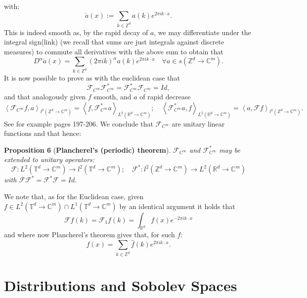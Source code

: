 \documentclass[
]{article}
\begin{document}
with: \[\check{a}(x):=\sum_{k\in{\mathbb Z}^d}a(k)e^{2\pi ik\cdot x}.\]
This is indeed smooth as, by the rapid decay of \(a\), we may
differentiate under the integral sign(link) (we recall that sums are
just integrals against discrete measures) to commute all derivatives
with the above sum to obtain that \[\label{dgivesrpft}
    D^\alpha \check{a}(x)=\sum_{k\in{\mathbb Z}^d}(2\pi ik)^\alpha a(k)e^{2\pi ik\cdot x}\quad\forall{a}\in {s({\mathbb Z}^d\to\mathbb{C}^m)}.\]
It is now possible to prove as with the euclidean case that
\[\mathcal{F}_{C^\infty}\mathcal{F}^*_{C^\infty}=\mathcal{F}^*_{C^\infty}\mathcal{F}_{C^\infty}=Id,\]
and that analogously given \(f\) smooth, and \(a\) of rapid decrease
\[\left\langle\mathcal{F}_{C^\infty} f,a\right\rangle_{l^2({\mathbb Z}^d\to\mathbb{C}^m)}=\left\langle f,\mathcal{F}_{C^\infty}^*a\right\rangle_{L^2({\mathbb R}^d\to\mathbb{C}^m)};\quad\left\langle\mathcal{F}_{C^\infty}^* a,f\right\rangle_{L^2({\mathbb R}^d\to\mathbb{C}^m)}=\left\langle a,\mathcal{F}f\right\rangle_{l^2({\mathbb Z}^d\to\mathbb{C}^m)}.\]
See for example \cite{Tay} pages 197-206. We conclude that
\(\mathcal{F}_{C^\infty}\) are unitary linear functions and that hence:

\leavevmode{}%
\textbf{Proposition 6} (\textbf{Plancherel's (periodic) theorem}).
\emph{\(\mathcal{F}_{C^\infty}\) and \(\mathcal{F}_{C^\infty}^*\) may be
extended to unitary operators:
\[\mathcal{F}:L^2({\mathbb T}^d\to\mathbb{C}^m)\to l^2({\mathbb T}^d\to\mathbb{C}^m);\quad \mathcal{F}^*:l^2({\mathbb Z}^d\to\mathbb{C}^m)\to L^2({\mathbb R}^d\to\mathbb{C}^m)\]
with \(\mathcal{F}\mathcal{F}^*=\mathcal{F}^*\mathcal{F}=Id.\)}

We note that, as for the Euclidean case, given
\(f\in L^2({\mathbb T}^d\to\mathbb{C}^m)\cap L^1({\mathbb T}^d\to\mathbb{C}^m)\)
by an identical argument it holds that
\[\mathcal{F}f(k)=\mathcal{F}_1f(k)=\int_{{\mathbb R}^d}f(x)e^{-2\pi ik\cdot x}\]
and where now Plancherel's theorem gives that, for such \(f\):
\[\label{Plancerelpft}
    f(x)=\sum_{k\in{\mathbb Z}^d}\hat{f}(k)e^{2\pi ik\cdot x}.\]

\hypertarget{distributions-and-sobolev-spaces}{%
\section{Distributions and Sobolev
Spaces}\label{distributions-and-sobolev-spaces}}
\end{document}
